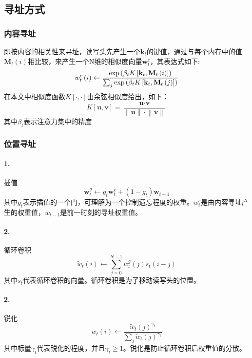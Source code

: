 \documentclass{article} %
\begin{document}
\begin{CJK*}{UTF8}{gkai}
\subsection{寻址方式}
\subsubsection{内容寻址}
即按内容的相关性来寻址，读写头先产生一个$\textbf{k} _{t}$的键值，通过与每个内存中的值$\textbf{M} _{t}\left( i \right)$相比较，来产生一个N维的相似度向量$ \textbf{w} ^{c}_{t}$，其表达式如下:
$$ w ^{c}_{t} \left( i \right) \leftarrow \frac{{\rm exp} \left ( \beta _{t}K \left [ \textbf{k} _{t}, \textbf{M} _{t} \left ( i \right ) \right ] \right )}{\sum _{j} {\rm exp} \left ( \beta _{t}K \left [ \textbf{k} _{t}, \textbf{M} _{t} \left ( j \right ) \right ] \right )}$$
在本文中相似度函数$K \left [ \cdot, \cdot \right ]$由余弦相似度给出，如下：
$$ K \left [ \textbf{u}, \textbf{v}  \right ] = \frac{\textbf{u} \cdot \textbf{v}}{\left \| \textbf{u} \right \| \cdot \left \| \textbf{v} \right \|}$$
其中$\beta _{t}$表示注意力集中的精度
\subsubsection{位置寻址}
\paragraph{1.}插值
$$ \textbf{w} ^{g}_{t} \leftarrow g _{t} \textbf{w} ^{c}_{t} + \left ( 1 - g _{t} \right ) \textbf{w} _{t-1} $$
其中${g}_{t}$表示插值的一个门，可理解为一个控制遗忘程度的权重。$w ^{c}_{t}$是由内容寻址产生的权重值，$w _{t-1}$是前一时刻的寻址权重值。
\paragraph{2.}循环卷积
$$ \tilde{w} _{t} \left( i \right) \leftarrow  \sum ^{N-1}_{j=0} w ^{g}_{t} \left( j \right) s _{t} \left( i-j \right)$$
其中$s _{t}$代表循环卷积的向量。循环卷积是为了移动读写头的位置。
\paragraph{2.}锐化
$$ w _{t} \left( i \right) \leftarrow \frac{\tilde{w} _{t} \left( j \right) ^{\gamma _{t}}}{\sum _{j} \tilde{w} _{t} \left( j \right) ^{\gamma _{t}}} $$
其中标量$\gamma _{t}$代表锐化的程度，并且$\gamma _{t} \geq 1$。锐化是防止循环卷积后权重值的分散。


\end{CJK*}
\end{document}
